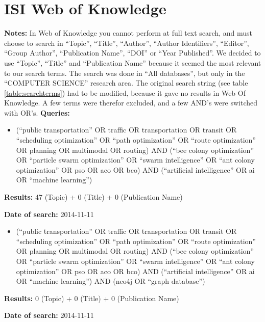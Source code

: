 \section{ISI Web of Knowledge}
\par \textbf{Notes:} In Web of Knowledge you cannot perform at full text search, and must choose to search in ``Topic'', ``Title'', ``Author'', ``Author Identifiers'', ``Editor'', ``Group Author'', ``Publication Name'', ``DOI'' or ``Year Published''. We decided to use ``Topic'', ``Title'' and ``Publication Name'' because it seemed the most relevant to our search terms. The search was done in ``All databases'', but only in the ``COMPUTER SCIENCE'' research area. The original search string (see table \ref{table:searchterms}) had to be modified, because it gave no results in Web Of Knowledge. A few terms were therefor excluded, and a few AND's were switched with OR's. 
\newline
\newline
\textbf{Queries:}
\begin{itemize}
	\item (``public transportation'' OR traffic OR transportation OR transit OR ``scheduling optimization'' OR ``path optimization'' OR ``route optimization'' OR planning OR multimodal OR routing) AND (``bee colony optimization'' OR ``particle swarm optimization'' OR ``swarm intelligence'' OR ``ant colony optimization'' OR pso OR aco OR bco) AND (``artificial intelligence'' OR ai OR ``machine learning'')
\end{itemize}
\par \textbf{Results:} 47 (Topic) + 0 (Title) + 0 (Publication Name)
\par \textbf{Date of search:} 2014-11-11 
\begin{itemize}
	\item (``public transportation'' OR traffic OR transportation OR transit OR ``scheduling optimization'' OR ``path optimization'' OR ``route optimization'' OR planning OR multimodal OR routing) AND (``bee colony optimization'' OR ``particle swarm optimization'' OR ``swarm intelligence'' OR ``ant colony optimization'' OR pso OR aco OR bco) AND (``artificial intelligence'' OR ai OR ``machine learning'') AND (neo4j OR ``graph database'')
\end{itemize}
\par \textbf{Results:} 0 (Topic) + 0 (Title) + 0 (Publication Name)
\par \textbf{Date of search:} 2014-11-11 

